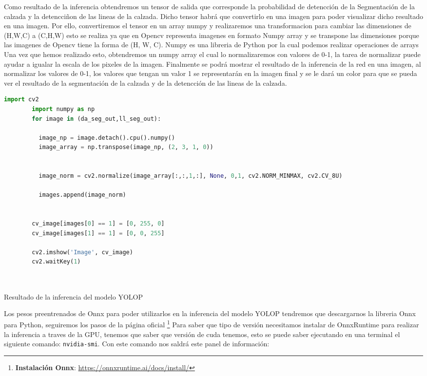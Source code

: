     Como resultado de la inferencia obtendremos un tensor de salida que corresponde la probabilidad de detencción de la Segmentación
    de la calzada y la detencciñon de las lineas de la calzada. Dicho tensor habrá que convertirlo en una imagen para poder visualizar
    dicho resultado en una imagen. 
    Por ello, convertiremos el tensor en un array numpy y realizaremos una transformacion para cambiar las dimensiones de (H,W,C) 
    a (C,H,W) esto se realiza ya que en Opencv representa imagenes en formato Numpy array y se transpone las dimensiones porque las
    imagenes de Opencv tiene la forma de (H, W, C). Numpy es una libreria de Python por la cual podemos realizar operaciones de arrays
    \newline
    Una vez que hemos realizado esto, obtendremos un numpy array el cual lo normalizaremos con valores de 0-1, la tarea de normalizar 
    puede ayudar a igualar la escala de los pixeles de la imagen. Finalmente se podrá mostrar el resultado de la inferencia de la red 
    en una imagen, al normalizar los valores de 0-1, los valores que tengan un valor 1 se representarán en la imagen final y se le dará un color
    para que se pueda ver el resultado de la segmentación de la calzada y de la detencción de las lineas de la calzada.
    \newpage
    \begin{code}[h]
      \begin{lstlisting}[language=Python]
        import cv2
        import numpy as np
        for image in (da_seg_out,ll_seg_out):

          image_np = image.detach().cpu().numpy()
          image_array = np.transpose(image_np, (2, 3, 1, 0))

        
          image_norm = cv2.normalize(image_array[:,:,1,:], None, 0,1, cv2.NORM_MINMAX, cv2.CV_8U)

          images.append(image_norm)

    
        cv_image[images[0] == 1] = [0, 255, 0]
        cv_image[images[1] == 1] = [0, 0, 255]

        cv2.imshow('Image', cv_image)
        cv2.waitKey(1)

    
      \end{lstlisting}
      \caption[Resultado de la inferencia del modelo YOLOP]{Resultado de la inferencia del modelo YOLOP}
      \label{cod:codejemplo}
      \end{code}  

      Los pesos preentrenados de Onnx para poder utilizarlos en la inferencia del modelo YOLOP tendremos que descargarnos la libreria Onnx para Python, 
      seguiremos los pasos de la página oficial \footnote{\textbf{Instalación Onnx}: \url{https://onnxruntime.ai/docs/install/}}
      Para saber que tipo de versión necesitamos instalar de OnnxRuntime para realizar la inferencia a traves de la GPU, tenemos que saber que versión de cuda
      tenemos, esto se puede saber ejecutando en una terminal el siguiente comando:  \texttt{nvidia-smi}. Con este comando nos saldrá este panel de información:

